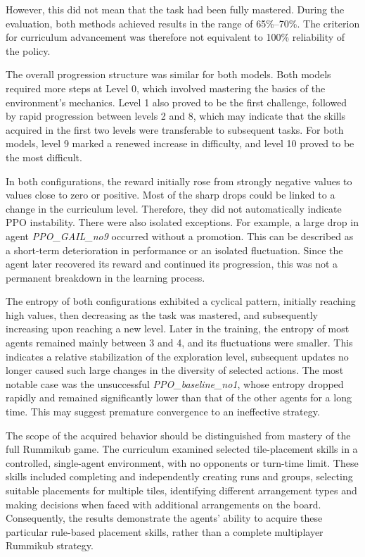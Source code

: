 However, this did not mean that the task had been fully mastered. During the evaluation, both methods achieved results in the range of 65\%–70\%. The criterion for curriculum advancement was therefore not equivalent to 100\% reliability of the policy.

The overall progression structure was similar for both models. Both models required more steps at Level 0, which involved mastering the basics of the environment’s mechanics. Level 1 also proved to be the first challenge, followed by rapid progression between levels 2 and 8, which may indicate that the skills acquired in the first two levels were transferable to subsequent tasks. For both models, level 9 marked a renewed increase in difficulty, and level 10 proved to be the most difficult.

In both configurations, the reward initially rose from strongly negative values to values close to zero or positive. Most of the sharp drops could be linked to a change in the curriculum level. Therefore, they did not automatically indicate PPO instability. There were also isolated exceptions. For example, a large drop in agent \textit{PPO\_GAIL\_no9} occurred without a promotion. This can be described as a short-term deterioration in performance or an isolated fluctuation. Since the agent later recovered its reward and continued its progression, this was not a permanent breakdown in the learning process.

The entropy of both configurations exhibited a cyclical pattern, initially reaching high values, then decreasing as the task was mastered, and subsequently increasing upon reaching a new level. Later in the training, the entropy of most agents remained mainly between 3 and 4, and its fluctuations were smaller. This indicates a relative stabilization of the exploration level, subsequent updates no longer caused such large changes in the diversity of selected actions. The most notable case was the unsuccessful \textit{PPO\_baseline\_no1}, whose entropy dropped rapidly and remained significantly lower than that of the other agents for a long time. This may suggest premature convergence to an ineffective strategy.

The scope of the acquired behavior should be distinguished from mastery of the full Rummikub game. The curriculum examined selected tile-placement skills in a controlled, single-agent environment, with no opponents or turn-time limit. These skills included completing and independently creating runs and groups, selecting suitable placements for multiple tiles, identifying different arrangement types and making decisions when faced with additional arrangements on the board. Consequently, the results demonstrate the agents' ability to acquire these particular rule-based placement skills, rather than a complete multiplayer Rummikub strategy.


